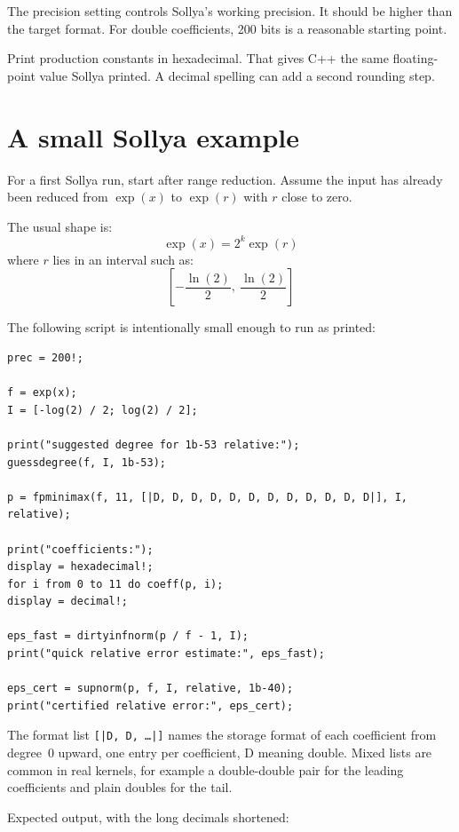 \documentclass[manuscript, nonacm]{acmart}
\begin{document}
    The precision setting controls Sollya's working precision. It should be
    higher than the target format. For double coefficients, 200 bits is a
    reasonable starting point.

    Print production constants in hexadecimal. That gives C++ the same
    floating-point value Sollya printed. A decimal spelling can add a second
    rounding step.



    \section{A small Sollya example}
    \label{sec:sollyaexample}

    For a first Sollya run, start after range reduction. Assume the input has
    already been reduced from $\exp(x)$ to $\exp(r)$ with $r$ close to zero.

    The usual shape is:
    \[ \exp(x) = 2^k \exp(r) \]
    where $r$ lies in an interval such as:
    \[ \left[-\frac{\ln(2)}{2},\ \frac{\ln(2)}{2}\right] \]

    The following script is intentionally small enough to run as printed:
    \begin{lstlisting}[style=sollya]
prec = 200!;

f = exp(x);
I = [-log(2) / 2; log(2) / 2];

print("suggested degree for 1b-53 relative:");
guessdegree(f, I, 1b-53);

p = fpminimax(f, 11, [|D, D, D, D, D, D, D, D, D, D, D, D|], I, relative);

print("coefficients:");
display = hexadecimal!;
for i from 0 to 11 do coeff(p, i);
display = decimal!;

eps_fast = dirtyinfnorm(p / f - 1, I);
print("quick relative error estimate:", eps_fast);

eps_cert = supnorm(p, f, I, relative, 1b-40);
print("certified relative error:", eps_cert);
    \end{lstlisting}

    The format list \texttt{[|D, D, \ldots|]} names the storage format of
    each coefficient from degree~0 upward, one entry per coefficient, D
    meaning double. Mixed lists are common in real kernels, for example a
    double-double pair for the leading coefficients and plain doubles for
    the tail.

    Expected output, with the long decimals shortened:
\end{document}
